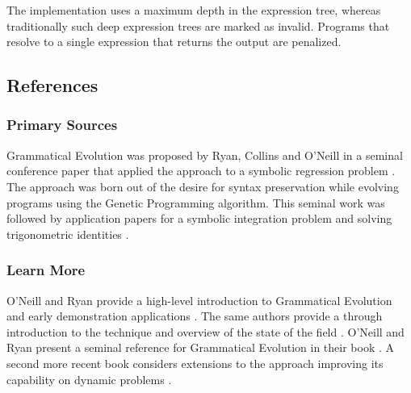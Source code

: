 The implementation uses a maximum depth in the expression tree, whereas traditionally such deep expression trees are marked as invalid. Programs that resolve to a single expression that returns the output are penalized. 




\subsection{References}

% 
% 
\subsubsection{Primary Sources}
Grammatical Evolution was proposed by Ryan, Collins and O'Neill in a seminal conference paper that applied the approach to a symbolic regression problem \cite{Ryan1998a}. 
The approach was born out of the desire for syntax preservation while evolving programs using the Genetic Programming algorithm.
This seminal work was followed by application papers for a symbolic integration problem \cite{O'Neill1998, O'Neill1998a} and solving trigonometric identities \cite{Ryan1998}.

% 
% 
\subsubsection{Learn More}
O'Neill and Ryan provide a high-level introduction to Grammatical Evolution and early demonstration applications \cite{O'Neill1999}. The same authors provide a through introduction to the technique and overview of the state of the field \cite{O'Neill2001}.
O'Neill and Ryan present a seminal reference for Grammatical Evolution in their book \cite{O'Neill2003}. A second more recent book considers extensions to the approach improving its capability on dynamic problems \cite{Dempsey2009}.
